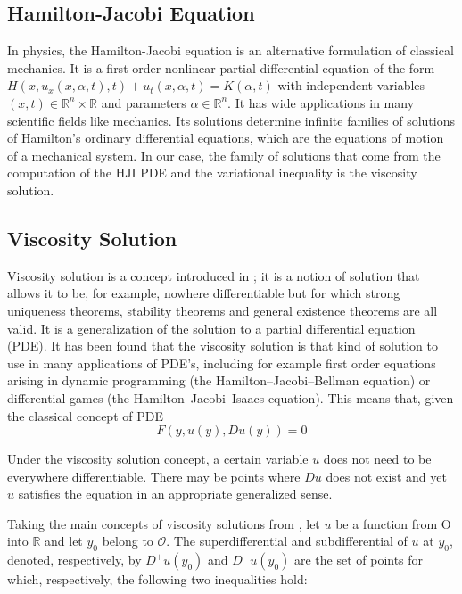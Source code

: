 \subsection{Hamilton-Jacobi Equation}					
In physics, the Hamilton-Jacobi equation is an alternative formulation of classical mechanics. It is a first-order nonlinear partial differential equation of the form $H(x,u_x(x,\alpha,t),t)+u_t(x,\alpha,t)=K(\alpha,t)$ with independent variables $(x,t)\in \mathbb{R}^n \times \mathbb{R}$ and parameters $\alpha \in \mathbb{R}^n$. It has wide applications in many scientific fields like mechanics. Its solutions determine infinite families of solutions of Hamilton's ordinary differential equations, which are the equations of motion of a mechanical system. In our case, the family of solutions that come from the computation of the HJI PDE and the variational inequality is the viscosity solution. 

\subsection{Viscosity Solution}

Viscosity solution is a concept introduced in \cite{vis_sol}; it is a notion of solution that allows it to be, for example, nowhere differentiable but for which strong uniqueness theorems, stability theorems and general existence theorems are all valid. It is a generalization of the solution to a partial differential equation (PDE). It has been found that the viscosity solution is that kind of solution to use in many applications of PDE's, including for example first order equations arising in dynamic programming (the Hamilton–Jacobi–Bellman equation) or differential games (the Hamilton–Jacobi–Isaacs equation). This means that, given the classical concept of PDE 
\begin{equation}
	\label{diff_eq}
	F(y,u(y), Du(y))=0
\end{equation}

Under the viscosity solution concept, a certain variable $u$ does not need to be everywhere differentiable. There may be points where $Du$ does not exist and yet $u$ satisfies the equation in an appropriate generalized sense.

Taking the main concepts of viscosity solutions from \cite{vis_sol}, let $u$ be a function from O into $\mathbb{R}$  and let $y_0$ belong to $\mathcal{O}$.  The superdifferential and subdifferential of $u$ at $y_0$, denoted, respectively, by $D^{+} u(y_0)$ and $D^{-} u(y_0)$ are the set of points for which, respectively, the following two inequalities hold:

